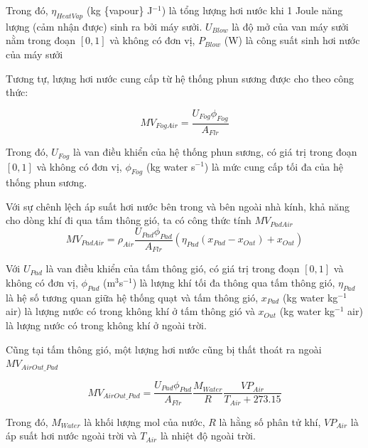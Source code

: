 \documentclass[a4paper]{article}
\begin{document}
Trong đó, $\eta_{HeatVap}$ (kg \{vapour\} J$^{-1}$) là tổng lượng hơi nước khi 1 Joule   năng lượng (cảm nhận được) sinh ra bởi máy sưởi. $U_{Blow}$ là độ mở của van máy sưởi nằm trong đoạn $[0,1]$ và không có đơn vị, $P_{Blow}$ (W) là công suất sinh hơi nước của máy sưởi 

Tương tự, lượng hơi nước cung cấp từ hệ thống phun sương được cho theo công thức:

 \begin{equation}\label{eq:mv_foggin}
	MV_{FogAir} = \frac{U_{Fog}\phi_{Fog}}{A_{Flr}} 
 \end{equation}
 
 Trong đó, $U_{Fog}$ là van điều khiển của hệ thống phun sương, có giá trị trong đoạn $[0,1]$ và không có đơn vị, $\phi_{Fog}$ (kg water s$^{-1}$) là mức cung cấp tối đa của hệ thống phun sương.
 
Với sự chênh lệch áp suất hơi nước bên trong và bên ngoài nhà kính, khả năng cho dòng khí đi qua tấm thông gió, ta có công thức tính $MV_{PadAir}$
  \begin{equation}\label{eq:mv_padair}
	MV_{PadAir} = \rho_{Air}\frac{U_{Pad}\phi_{Pad}}{A_{Flr}}(\eta_{Pad}(x_{Pad}-x_{Out})+ x_{Out})
 \end{equation}
 
Với $U_{Pad}$ là van điều khiển của tấm thông gió, có giá trị trong đoạn $[0,1]$ và không có đơn vị, $\phi_{Pad}$ (m$^3$s$^{-1}$) là lượng khí tối đa thông qua tấm thông gió, $\eta_{Pad}$ là hệ số tương quan giữa hệ thống quạt và tấm thông gió, $x_{Pad}$ (kg water kg$^{-1}$ air) là lượng nước có trong không khí ở tấm thông gió và $x_{Out}$ (kg water kg$^{-1}$ air) là lượng nước có trong không khí ở ngoài trời.

Cũng tại tấm thông gió, một lượng hơi nước cũng bị thất thoát ra ngoài $MV_{AirOut\_Pad}$

  \begin{equation}\label{eq:mv_airoutpad}
	MV_{AirOut\_Pad} = \frac{U_{Pad}\phi_{Pad}}{A_{Flr}}\frac{M_{Water}}{R}\frac{VP_{Air}}{T_{Air} +273.15}
 \end{equation}

Trong đó, $M_{Water}$ là khối lượng mol của nước, $R$ là hằng số phân tử khí, $VP_{Air}$ là áp suất hơi nước ngoài trời và $T_{Air}$ là nhiệt độ ngoài trời. 
\end{document}
